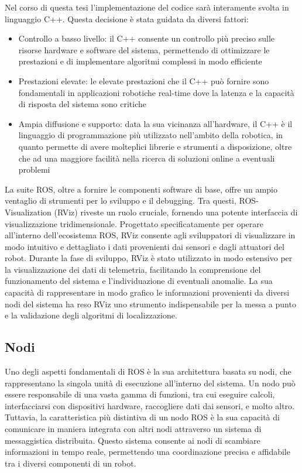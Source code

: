 \noindent Nel corso di questa tesi l'implementazione del codice sarà interamente svolta in linguaggio C++. Questa decisione è stata guidata da diversi fattori:

\begin{itemize}
  \item Controllo a basso livello: il C++ consente un controllo più preciso sulle risorse hardware e software del sistema, permettendo di ottimizzare le prestazioni e di implementare algoritmi complessi in modo efficiente
  \item Prestazioni elevate: le elevate prestazioni che il C++ può fornire sono fondamentali in applicazioni robotiche real-time dove la latenza e la capacità di risposta del sistema sono critiche
  \item Ampia diffusione e supporto: data la sua vicinanza all'hardware, il C++ è il linguaggio di programmazione più utilizzato nell'ambito della robotica, in quanto permette di avere molteplici librerie e strumenti a disposizione, oltre che ad una maggiore facilità nella ricerca di soluzioni online a eventuali problemi
\end{itemize}

\noindent La suite ROS, oltre a fornire le componenti software di base, offre un ampio ventaglio di strumenti per lo sviluppo e il debugging. Tra questi, ROS-Visualization (RViz) riveste un ruolo cruciale, fornendo una potente interfaccia di visualizzazione tridimensionale. Progettato specificatamente per operare all'interno dell'ecosistema ROS, RViz consente agli sviluppatori di visualizzare in modo intuitivo e dettagliato i dati provenienti dai sensori e dagli attuatori del robot. Durante la fase di sviluppo, RViz è stato utilizzato in modo estensivo per la visualizzazione dei dati di telemetria, facilitando la comprensione del funzionamento del sistema e l'individuazione di eventuali anomalie. La sua capacità di rappresentare in modo grafico le informazioni provenienti da diversi nodi del sistema ha reso RViz uno strumento indispensabile per la messa a punto e la validazione degli algoritmi di localizzazione.

\subsection{Nodi}
\noindent Uno degli aspetti fondamentali di ROS è la sua architettura basata su nodi, che rappresentano la singola unità di esecuzione all'interno del sistema. Un nodo può essere responsabile di una vasta gamma di funzioni, tra cui eseguire calcoli, interfacciarsi con dispositivi hardware, raccogliere dati dai sensori, e molto altro. Tuttavia, la caratteristica più distintiva di un nodo ROS è la sua capacità di comunicare in maniera integrata con altri nodi attraverso un sistema di messaggistica distribuita. Questo sistema consente ai nodi di scambiare informazioni in tempo reale, permettendo una coordinazione precisa e affidabile tra i diversi componenti di un robot.

